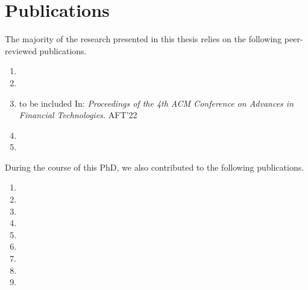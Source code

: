 \section{Publications}

The majority of the research presented in this thesis relies on the following peer-reviewed publications.

\begin{enumerate}
    \item {}
    \item {}
    \item {} to be included In: \emph{Proceedings of the 4th ACM Conference on Advances in Financial Technologies.} AFT'22
    \item {}
    \item {}
\end{enumerate}

During the course of this PhD, we also contributed to the following publications.

\begin{enumerate}
    \item {}
    \item {}
    \item {}
    \item {}
    \item {}
    \item {}
    \item {}
    \item {}
    \item {}
\end{enumerate}
